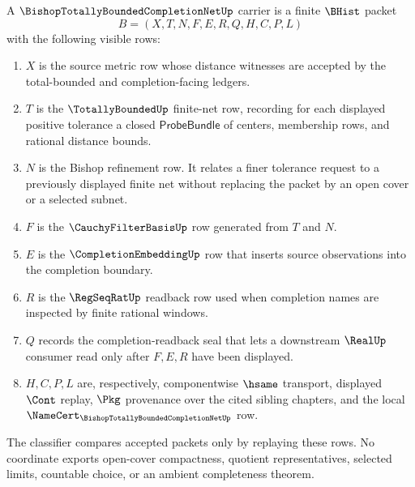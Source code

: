 \begin{definition}
\label{def:bishop-totally-bounded-completion-net-carrier}
A $\BishopTotallyBoundedCompletionNetUp$ carrier is a finite $\BHist$ packet
$$
B=(X,T,N,F,E,R,Q,H,C,P,L)
$$
with the following visible rows:
\begin{enumerate}
\item $X$ is the source metric row whose distance witnesses are accepted by the total-bounded and completion-facing ledgers.
\item $T$ is the $\TotallyBoundedUp$ finite-net row, recording for each displayed positive tolerance a closed $\mathsf{ProbeBundle}$ of centers, membership rows, and rational distance bounds.
\item $N$ is the Bishop refinement row. It relates a finer tolerance request to a previously displayed finite net without replacing the packet by an open cover or a selected subnet.
\item $F$ is the $\CauchyFilterBasisUp$ row generated from $T$ and $N$.
\item $E$ is the $\CompletionEmbeddingUp$ row that inserts source observations into the completion boundary.
\item $R$ is the $\RegSeqRatUp$ readback row used when completion names are inspected by finite rational windows.
\item $Q$ records the completion-readback seal that lets a downstream $\RealUp$ consumer read only after $F,E,R$ have been displayed.
\item $H,C,P,L$ are, respectively, componentwise $\hsame$ transport, displayed $\Cont$ replay, $\Pkg$ provenance over the cited sibling chapters, and the local $\NameCert_{\BishopTotallyBoundedCompletionNetUp}$ row.
\end{enumerate}
The classifier compares accepted packets only by replaying these rows. No coordinate exports open-cover compactness, quotient representatives, selected limits, countable choice, or an ambient completeness theorem.
\end{definition}

